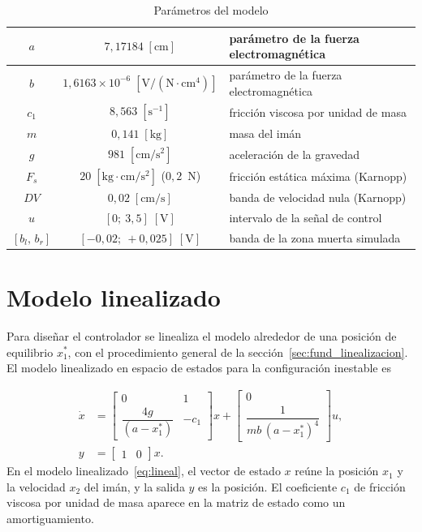 \begin{table}[ht]
\centering
\caption{Parámetros del modelo}
\label{tab:parametros}
\begin{tabular}{|c|c|l|}
\hline
$a$ & $7{,}17184\;[\text{cm}]$ & parámetro de la fuerza electromagnética \\ \hline
$b$ & $1{,}6163 \times 10^{-6}\;[\text{V}/(\text{N}\cdot\text{cm}^4)]$ & parámetro de la fuerza electromagnética \\ \hline
$c_1$ & $8{,}563\;[\text{s}^{-1}]$ & fricción viscosa por unidad de masa \\ \hline
$m$ & $0{,}141\;[\text{kg}]$ & masa del imán \\ \hline
$g$ & $981\;[\text{cm}/\text{s}^2]$ & aceleración de la gravedad \\ \hline
$F_s$ & $20\;[\text{kg}\cdot\text{cm}/\text{s}^2]$ ($0{,}2$~N) & fricción estática máxima (Karnopp) \\ \hline
$DV$ & $0{,}02\;[\text{cm}/\text{s}]$ & banda de velocidad nula (Karnopp) \\ \hline
$u$ & $[0;\ 3{,}5]\;[\text{V}]$ & intervalo de la señal de control \\ \hline
$[b_l,\,b_r]$ & $[-0{,}02;\ +0{,}025]\;[\text{V}]$ & banda de la zona muerta simulada \\ \hline
\end{tabular}
\end{table}

\section{Modelo linealizado}\label{sec:linealizado}

Para diseñar el controlador se linealiza el modelo alrededor de una posición de equilibrio $x_1^{\ast}$, con el procedimiento general de la sección~\ref{sec:fund_linealizacion}. El modelo linealizado en espacio de estados para la configuración inestable es

\begin{equation}
\begin{aligned}
\dot{x}
&=
\begin{bmatrix}
0 & 1 \\[6pt]
\dfrac{4g}{(a-x_1^{\ast})} & -c_1
\end{bmatrix}x
+
\begin{bmatrix}
0 \\[6pt]
\dfrac{1}{mb\,(a-x_1^{\ast})^4}
\end{bmatrix}u,
\\[10pt]
y &= \begin{bmatrix} 1 & 0 \end{bmatrix} x .
\end{aligned}
\label{eq:lineal}
\end{equation}
En el modelo linealizado~\eqref{eq:lineal}, el vector de estado $x$ reúne la posición $x_1$ y la velocidad $x_2$ del imán, y la salida $y$ es la posición. El coeficiente $c_1$ de fricción viscosa por unidad de masa aparece en la matriz de estado como un amortiguamiento.

